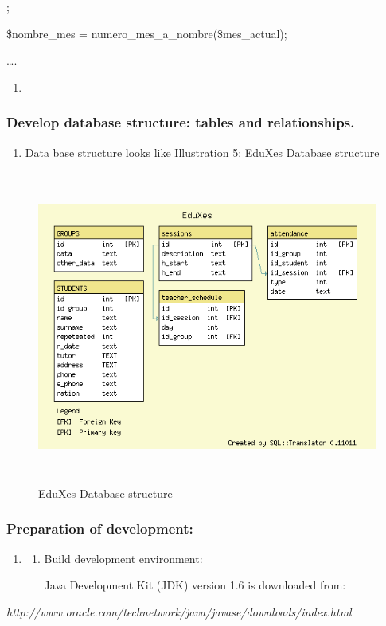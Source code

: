 \documentclass[a4paper]{article}
\begin{document}
{\textquotesingle}; 

\$nombre\_mes = numero\_mes\_a\_nombre(\$mes\_actual);

….

\begin{enumerate}
\item[] 
\bigskip
\end{enumerate}
\subsubsection[Develop database structure: tables and relationships.
]{Develop database structure: tables and relationships. }
\hypertarget{RefHeading146481801272074}{}\begin{enumerate}
\item[] Data base structure looks like Illustration 5: EduXes Database
structure 
\end{enumerate}


\begin{figure}
\centering
\includegraphics[width=14.208cm,height=10.319cm]{PhoneGapProjectMSWLMemory-img/PhoneGapProjectMSWLMemory-img6.png}
\caption[EduXes Database structure]{EduXes Database structure}
\label{seq:refIllustration4}

\end{figure}
\subsubsection[Preparation of development:]{Preparation of development:}
\hypertarget{RefHeading146501801272074}{}\begin{enumerate}
\item \begin{enumerate}
\item Build development environment: 

Java Development Kit (JDK) version 1.6 is downloaded from: 
\end{enumerate}
\end{enumerate}
{\itshape
http://www.oracle.com/technetwork/java/javase/downloads/index.html}
\end{document}
